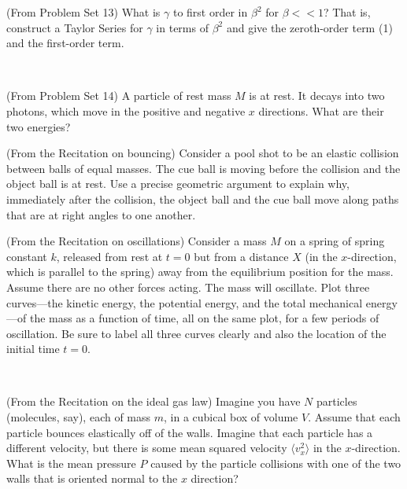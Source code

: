 \documentclass[12pt, letterpaper]{article}
\begin{document}
\vfill

\begin{problem} (From Problem Set 13)
  What is $\gamma$ to first order in $\beta^2$ for $\beta<< 1$?
  That is, construct a Taylor Series for $\gamma$ in terms of
  $\beta^2$ and give the zeroth-order term (1) and the first-order
  term.
\end{problem}

\vfill
~\clearpage

\begin{problem} (From Problem Set 14)
  A particle of rest mass $M$ is at rest.
  It decays into two photons, which move in the positive and negative $x$ directions.
  What are their two energies?
\end{problem}

\vfill

\begin{problem} (From the Recitation on bouncing)
  Consider a pool shot to be an elastic collision between balls of equal
  masses. The cue ball is moving before the collision and the object
  ball is at rest. Use a precise geometric argument to explain why,
  immediately after the collision, the
  object ball and the cue ball move along paths that are at right angles to one another.
\end{problem}

\vfill

\begin{problem} (From the Recitation on oscillations)
  Consider a mass $M$ on a spring of spring constant $k$, released from
  rest at $t=0$ but from a distance $X$ (in the $x$-direction, which is
  parallel to the spring) away from the equilibrium position for the
  mass.  Assume there are no other forces acting.
  The mass will oscillate.
  Plot three curves---the kinetic energy, the potential energy, and the total
  mechanical energy---of the mass as a function of time, all on the same plot,
  for a few periods of oscillation.
  Be sure to label all three curves clearly and also the location of the initial time $t=0$.
\end{problem}

\vfill
~\clearpage

\begin{problem} (From the Recitation on the ideal gas law)
  Imagine you have $N$ particles (molecules, say), each of mass $m$, in a cubical box of volume $V$.
  Assume that each particle bounces elastically off of the walls.
  Imagine that each particle has a different velocity, but there is some
  mean squared velocity $\langle v_x^2\rangle$ in the $x$-direction. What is the
  mean pressure $P$ caused by the particle collisions
  with one of the two walls that is oriented normal to the $x$ direction?
\end{problem}
\end{document}

